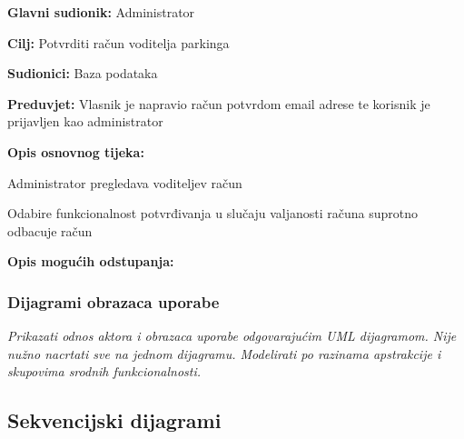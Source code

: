 \begin{packed_item}
\begin{packed_item}
\begin{packed_item}
\begin{packed_enum}
    					\end{packed_enum}
    						
    					\end{packed_item}
    				\end{packed_item}
    				\noindent {}
    				\begin{packed_item}
    					
    					\item \textbf{Glavni sudionik: } Administrator
    					\item  \textbf{Cilj:} Potvrditi račun voditelja parkinga
    					\item  \textbf{Sudionici:} Baza podataka
    					\item  \textbf{Preduvjet:} Vlasnik je napravio račun potvrdom email adrese te korisnik je prijavljen kao administrator
    					\item  \textbf{Opis osnovnog tijeka:}
    					
    					\item[] \begin{packed_enum}
    						
    						\item Administrator pregledava voditeljev račun
    						\item Odabire funkcionalnost potvrđivanja u slučaju valjanosti računa suprotno odbacuje račun

    					\end{packed_enum}
    					
    					\item  \textbf{Opis mogućih odstupanja:}
    					
    					
    				\end{packed_item}
    				
				
					
				\subsubsection{Dijagrami obrazaca uporabe}
					
					\textit{Prikazati odnos aktora i obrazaca uporabe odgovarajućim UML dijagramom. Nije nužno nacrtati sve na jednom dijagramu. Modelirati po razinama apstrakcije i skupovima srodnih funkcionalnosti.}
				\eject		
				
			\subsection{Sekvencijski dijagrami}
				

\end{packed_item}
